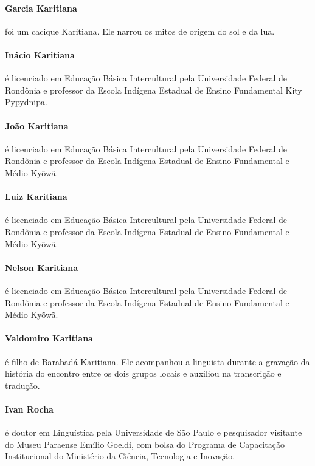  \paragraph{Garcia Karitiana} foi um cacique Karitiana. Ele narrou os mitos de origem
 do sol e da lua.

 \paragraph{Inácio Karitiana} é licenciado em Educação Básica Intercultural pela
 Universidade Federal de Rondônia e professor da Escola Indígena Estadual
 de Ensino Fundamental Kity Pypydnipa.

 \paragraph{João Karitiana} é licenciado em Educação Básica Intercultural pela
 Universidade Federal de Rondônia e professor da Escola Indígena Estadual
 de Ensino Fundamental e Médio Kyõwã.

 \paragraph{Luiz Karitiana} é licenciado em Educação Básica Intercultural pela
 Universidade Federal de Rondônia e professor da Escola Indígena Estadual
 de Ensino Fundamental e Médio Kyõwã.

 \paragraph{Nelson Karitiana} é licenciado em Educação Básica Intercultural pela
 Universidade Federal de Rondônia e professor da Escola Indígena Estadual
 de Ensino Fundamental e Médio Kyõwã.

 \paragraph{Valdomiro Karitiana} é filho de Barabadá Karitiana. Ele acompanhou a
 linguista durante a gravação da história do encontro entre os dois
 grupos locais e auxiliou na transcrição e tradução.

 \paragraph{Ivan Rocha} é doutor em Linguística pela Universidade de São Paulo e
 pesquisador visitante do Museu Paraense Emílio Goeldi, com bolsa do
 Programa de Capacitação Institucional do Ministério da Ciência,
 Tecnologia e Inovação. %

